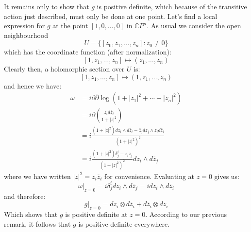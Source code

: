 \documentclass[11pt]{amsart}
\theoremstyle{definition}
\def \CP{ \mathbb{C}P }
\def \del{ \partial }
\def \delbar{ \bar{\partial} }
\begin{document}
It remains only to show that $g$ is positive definite, which because of the transitive action just described, must only be done at one point.  Let's find a local expression for $g$ at the point $[1,0, \ldots, 0]$ in $\CP^n$.  As usual we consider the open neighbourhood
%
$$U = \{ [z_0,z_1, \ldots, z_n]: z_0 \neq 0 \} $$
%
which has the coordinate function (after normalization):
%
$$[1,z_1, \ldots, z_n] \mapsto (z_1, \ldots, z_n)$$
%
Clearly then, a holomorphic section over $U$ is:
%
$$[1,z_1, \ldots, z_n] \mapsto (1,z_1, \ldots, z_n)$$
%
and hence we have:
%
\begin{align*}
\omega &= i \del \delbar \log( 1 + |z_1|^2 + \cdots + |z_n|^2 ) \\
&= i \del \left( \frac{ z_i d\bar{z}_i }{ 1 + |z|^2 } \right) \\
&= i \frac{ (1 + |z|^2 ) dz_i \wedge d \bar{z}_i - \bar{z}_j d z_j \wedge z_i d \bar{z}_i }{ (1 + |z|^2 )^2 } \\
&= i \frac{ (1 + |z|^2)\delta^i_j - \bar{z}_i z_j }{ (1 + |z|^2)^2 } d z_i \wedge d \bar{z}_j
\end{align*}
%
where we have written $|z|^2 = z_i \bar{z}_i$ for convenience.  Evaluating at $z=0$ gives us:
%
$$ \omega|_{z=0} = i \delta^i_j dz_i \wedge d \bar{z}_j = i dz_i \wedge d \bar{z}_i $$
%
and therefore:
%
$$ g|_{z=0} = dz_i \otimes d \bar{z}_i + d \bar{z}_i \otimes d z_i $$
%
Which shows that $g$ is positive definite at $z=0$.  According to our previous remark, it follows that $g$ is positive definite everywhere.
\end{document}
